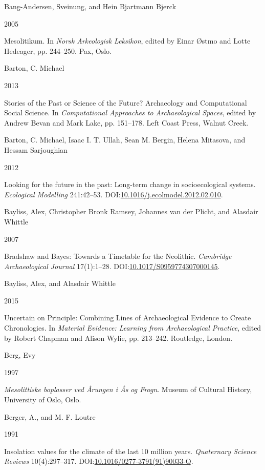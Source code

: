 \documentclass[
  12pt,
  a4paper,
  oneside]{book}
\newlength{\cslhangindent}
\newlength{\csllabelwidth}
\newlength{\cslentryspacingunit} %
\newenvironment{CSLReferences}[2] %
 {%
  \setlength{\parindent}{0pt}
  \ifodd #1
  \let\oldpar\par
  \def\par{\hangindent=\cslhangindent\oldpar}
  \fi
  \setlength{\parskip}{#2\cslentryspacingunit}
 }%
 {}
\newcommand{\CSLBlock}[1]{#1\hfill\break}
\newcommand{\CSLLeftMargin}[1]{\parbox[t]{\csllabelwidth}{#1}}
\newcommand{\CSLRightInline}[1]{\parbox[t]{\linewidth - \csllabelwidth}{#1}\break}
\begin{document}
\begin{CSLReferences}{0}{0}
\leavevmode{}%
\CSLBlock{Bang-Andersen, Sveinung, and Hein Bjartmann Bjerck}
\CSLLeftMargin{ 2005}
\CSLRightInline{{Mesolitikum}. In \emph{{Norsk Arkeologisk Leksikon}}, edited by Einar Østmo and Lotte Hedeager, pp. 244--250. Pax, Oslo.}

\leavevmode{}%
\CSLBlock{Barton, C. Michael}
\CSLLeftMargin{ 2013}
\CSLRightInline{{Stories of the Past or Science of the Future? Archaeology and Computational Social Science}. In \emph{{Computational Approaches to Archaeological Spaces}}, edited by Andrew Bevan and Mark Lake, pp. 151--178. Left Coast Press, Walnut Creek.}

\leavevmode{}%
\CSLBlock{Barton, C. Michael, Isaac I. T. Ullah, Sean M. Bergin, Helena Mitasova, and Hessam Sarjoughian}
\CSLLeftMargin{ 2012}
\CSLRightInline{{Looking for the future in the past: Long-term change in socioecological systems}. \emph{Ecological Modelling} 241:42--53. DOI:\href{https://doi.org/10.1016/j.ecolmodel.2012.02.010}{10.1016/j.ecolmodel.2012.02.010}.}

\leavevmode{}%
\CSLBlock{Bayliss, Alex, Christopher Bronk Ramsey, Johannes van der Plicht, and Alasdair Whittle}
\CSLLeftMargin{ 2007}
\CSLRightInline{{Bradshaw and Bayes: Towards a Timetable for the Neolithic}. \emph{Cambridge Archaeological Journal} 17(1):1--28. DOI:\href{https://doi.org/10.1017/S0959774307000145}{10.1017/S0959774307000145}.}

\leavevmode{}%
\CSLBlock{Bayliss, Alex, and Alasdair Whittle}
\CSLLeftMargin{ 2015}
\CSLRightInline{{Uncertain on Principle: Combining Lines of Archaeological Evidence to Create Chronologies}. In \emph{{Material Evidence: Learning from Archaeological Practice}}, edited by Robert Chapman and Alison Wylie, pp. 213--242. Routledge, London.}

\leavevmode{}%
\CSLBlock{Berg, Evy}
\CSLLeftMargin{ 1997}
\CSLRightInline{\emph{{Mesolittiske boplasser ved Årungen i Ås og Frogn}}. Museum of Cultural History, University of Oslo, Oslo.}

\leavevmode{}%
\CSLBlock{Berger, A., and M. F. Loutre}
\CSLLeftMargin{ 1991}
\CSLRightInline{Insolation values for the climate of the last 10 million years. \emph{Quaternary Science Reviews} 10(4):297--317. DOI:\href{https://doi.org/10.1016/0277-3791(91)90033-Q}{10.1016/0277-3791(91)90033-Q}.}


\end{CSLReferences}
\end{document}

